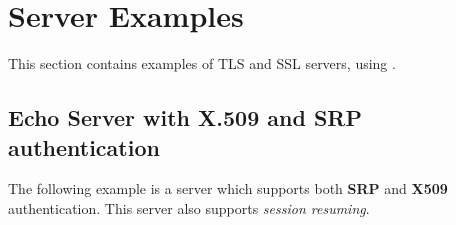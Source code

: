 \documentclass{book}
\begin{document}


\section{Server Examples}
This section contains examples of TLS and SSL servers, using \gnutls.

\subsection{Echo Server with X.509 and SRP authentication}
The following example is a server which supports both {\bf SRP} and {\bf X509} authentication.
This server also supports {\it session resuming}.







\end{document}
